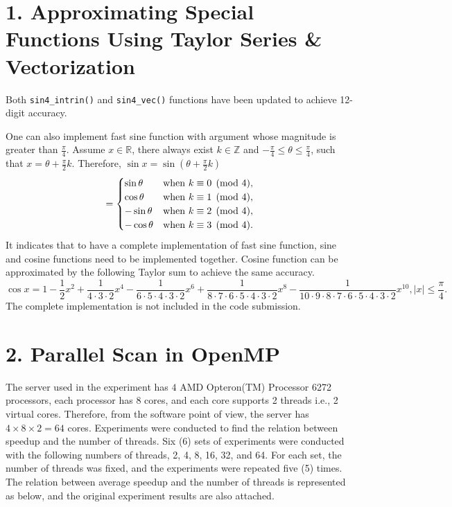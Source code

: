\documentclass[amsmath,amssymb]{revtex4}
\begin{document}
\section{\label{sec:sec1}1. Approximating Special Functions Using Taylor Series \& Vectorization}
Both {\tt sin4\_intrin()} and {\tt sin4\_vec()} functions have been updated to achieve 12-digit accuracy.

One can also implement fast sine function with argument whose magnitude is greater than $\frac{\pi}{4}$. Assume $x\in \mathbb{R}$, there always exist $k\in \mathbb{Z}$ and $-\frac{\pi}{4}\le\theta\le\frac{\pi}{4}$, such that $x = \theta + \frac{\pi}{2}k$. Therefore, $\sin{x} = \sin{(\theta +\frac{\pi}{2}k)}$
\begin{equation}
=
\begin{cases}
  \sin{\theta}& {\rm when~}k\equiv0\pmod 4,\\
  \cos{\theta}& {\rm when~}k\equiv1\pmod 4,\\
  -\sin{\theta}& {\rm when~}k\equiv2\pmod 4,\\
  -\cos{\theta}& {\rm when~}k\equiv3\pmod 4.\\
\end{cases}
\end{equation}
It indicates that to have a complete implementation of fast sine function, sine and cosine functions need to be implemented together. Cosine function can be approximated by the following Taylor sum to achieve the same accuracy.
\begin{equation}
\cos{x} = 1 - \frac{1}{2}x^2 + \frac{1}{4\cdot3\cdot2}x^4 - \frac{1}{6\cdot5\cdot4\cdot3\cdot2}x^6 + \frac{1}{8\cdot7\cdot6\cdot5\cdot4\cdot3\cdot2}x^8 - \frac{1}{10\cdot9\cdot8\cdot7\cdot6\cdot5\cdot4\cdot3\cdot2}x^{10}, \mid x\mid\le\frac{\pi}{4}.
\end{equation}
The complete implementation is not included in the code submission.

\section{\label{sec:sec2}2. Parallel Scan in OpenMP}
The server used in the experiment has $4$ AMD Opteron(TM) Processor 6272 processors, each processor has 8 cores, and each core supports 2 threads i.e., 2 virtual cores. Therefore, from the software point of view, the server has $4\times8\times2 = 64$ cores. Experiments were conducted to find the relation between speedup and the number of threads. Six (6) sets of experiments were conducted with the following numbers of threads, 2, 4, 8, 16, 32, and 64. For each set, the number of threads was fixed, and the experiments were repeated five (5) times. The relation between average speedup and the number of threads is represented as below, and the original experiment results are also attached.
\end{document}
